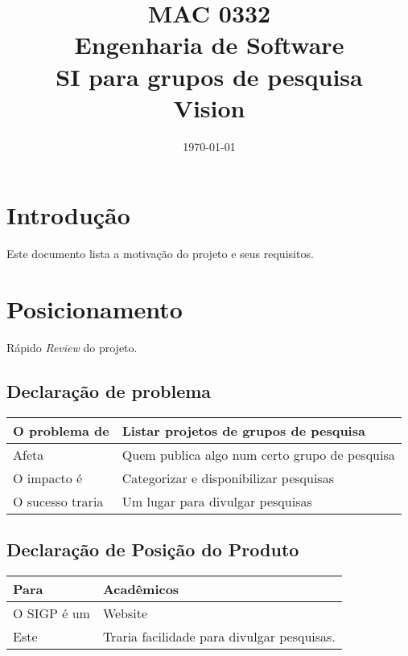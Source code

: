 \documentclass[11pt, a4paper]{article}
\title{MAC 0332\\
	Engenharia de Software\\
	SI para grupos de pesquisa\\
	Vision}
\date{\today}
\begin{document}
	\maketitle
	\newpage
    \section{Introdução}
        Este documento lista a motivação do projeto e seus requisitos.
    
    \section{Posicionamento}
        Rápido \emph{Review} do projeto.
        
        \subsection{Declaração de problema}
            \begin{tabular}{| l | l |}
                \hline                       
                O problema de & Listar projetos de grupos de pesquisa \\ \hline
                Afeta & Quem publica algo num certo grupo de pesquisa \\ \hline
                O impacto é & Categorizar e disponibilizar pesquisas \\ \hline
                O sucesso traria & Um lugar para divulgar pesquisas \\
                \hline  
            \end{tabular}
        
        \subsection{Declaração de Posição do Produto}
            \begin{tabular}{| l | l |}
                \hline                       
                Para & Acadêmicos \\ \hline
                O SIGP é um & Website \\ \hline
                Este & Traria facilidade para divulgar pesquisas. \\
                \hline
            \end{tabular}
\end{document}
